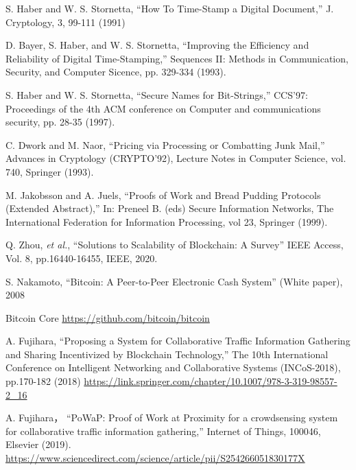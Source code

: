 \documentclass[graybox]{svmult}
\begin{document}
\begin{thebibliography}{99}

  S. Haber and W. S. Stornetta, 
  ``How To Time-Stamp a Digital Document,''
  J. Cryptology, 3, 99-111 (1991)

  D. Bayer, S. Haber, and W. S. Stornetta,
  ``Improving the Efficiency and Reliability of Digital Time-Stamping,''
  Sequences II: Methods in Communication, Security, and Computer Sicence, 
  pp. 329-334 (1993).

  S. Haber and W. S. Stornetta, 
  ``Secure Names for Bit-Strings,''
  CCS'97: Proceedings of the 4th ACM conference on Computer and 
  communications security, pp. 28-35 (1997).


  C. Dwork and M. Naor, 
  ``Pricing via Processing or Combatting Junk Mail,''
  Advances in Cryptology (CRYPTO'92), 
  Lecture Notes in Computer Science, vol. 740, Springer (1993). 


  M. Jakobsson and A. Juels, 
  ``Proofs of Work and Bread Pudding Protocols (Extended Abstract),''
  In: Preneel B. (eds) Secure Information Networks, 
  The International Federation for Information Processing, 
  vol 23, Springer (1999).


  Q. Zhou, \textit{et al.}, 
  ``Solutions to Scalability of Blockchain: A Survey''
  IEEE Access, Vol. 8, pp.16440-16455, IEEE, 2020. 




  S. Nakamoto, 
  ``Bitcoin: A Peer-to-Peer Electronic Cash System''
  (White paper), 2008 


  Bitcoin Core 
  \url{https://github.com/bitcoin/bitcoin}


  A. Fujihara,
  ``Proposing a System for Collaborative Traffic Information Gathering and 
  Sharing Incentivized by Blockchain Technology,''
  The 10th International Conference on Intelligent Networking and 
  Collaborative Systems (INCoS-2018), pp.170-182 (2018)
  \url{https://link.springer.com/chapter/10.1007/978-3-319-98557-2_16}


  A. Fujihara，
  ``PoWaP: Proof of Work at Proximity for a crowdsensing system for 
  collaborative traffic information gathering,'' 
  Internet of Things, 100046, Elsevier (2019).
  \url{https://www.sciencedirect.com/science/article/pii/S254266051830177X}


\end{thebibliography}
\end{document}
